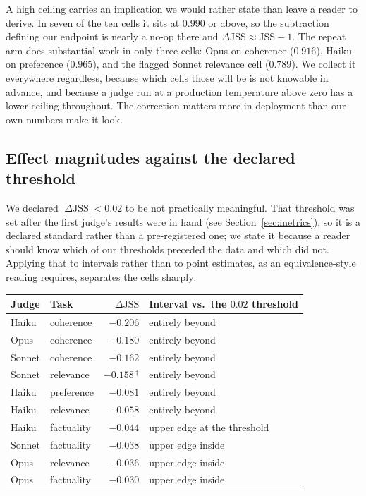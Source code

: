 \documentclass[11pt]{article}          %
\begin{document}
A high ceiling carries an implication we would rather state than leave a reader
to derive. In seven of the ten cells it sits at $0.990$ or above, so the
subtraction defining our endpoint is nearly a no-op there and
$\Delta\mathrm{JSS} \approx \mathrm{JSS} - 1$. The repeat arm does substantial
work in only three cells: Opus on coherence ($0.916$), Haiku on preference
($0.965$), and the flagged Sonnet relevance cell ($0.789$). We collect it
everywhere regardless, because which cells those will be is not knowable in
advance, and because a judge run at a production temperature above zero has a
lower ceiling throughout. The correction matters more in deployment than our own
numbers make it look.

\subsection{Effect magnitudes against the declared threshold}
\label{sec:results-sesoi}

We declared $|\Delta\mathrm{JSS}| < 0.02$ to be not practically meaningful. That
threshold was set after the first judge's results were in hand (see
Section~\ref{sec:metrics}), so it is a declared standard rather than a
pre-registered one; we state it because a reader should know which of our
thresholds preceded the data and which did not. Applying that to intervals rather than to point estimates, as an
equivalence-style reading requires, separates the cells sharply:

\begin{center}
\begin{tabular}{llrl}
\toprule
Judge & Task & $\Delta\mathrm{JSS}$ & Interval vs.\ the $0.02$ threshold \\
\midrule
Haiku  & coherence  & $-0.206$ & entirely beyond \\
Opus   & coherence  & $-0.180$ & entirely beyond \\
Sonnet & coherence  & $-0.162$ & entirely beyond \\
Sonnet & relevance  & $-0.158$\,$^{\dagger}$ & entirely beyond \\
Haiku  & preference & $-0.081$ & entirely beyond \\
Haiku  & relevance  & $-0.058$ & entirely beyond \\
\midrule
Haiku  & factuality & $-0.044$ & upper edge at the threshold \\
Sonnet & factuality & $-0.038$ & upper edge inside \\
Opus   & relevance  & $-0.036$ & upper edge inside \\
Opus   & factuality & $-0.030$ & upper edge inside \\
\bottomrule
\end{tabular}
\end{center}
\end{document}

